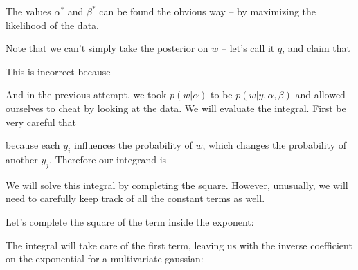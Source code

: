 \documentclass[12pt]{article}
\begin{document}

The values $\alpha^*$ and $\beta^*$ can be found the obvious way -- by maximizing the likelihood of the data.


Note that we can't simply take the posterior on $w$ -- let's call it $q$, and claim that


This is incorrect because


And in the previous attempt, we took $p(w|\alpha)$ to be $p(w|y, \alpha, \beta)$ and allowed ourselves to cheat by looking at the data. We will evaluate the integral. First be very careful that 


because each $y_i$ influences the probability of $w$, which changes the probability of another $y_j$. Therefore our integrand is


We will solve this integral by completing the square. However, unusually, we will need to carefully keep track of all the constant terms as well.


Let's complete the square of the term inside the exponent:

The integral will take care of the first term, leaving us with the inverse coefficient on the exponential for a multivariate gaussian:
\end{document}
